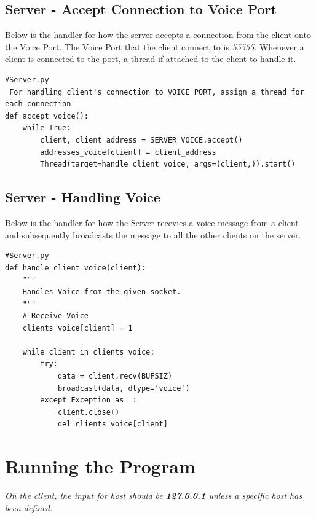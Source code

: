 \documentclass[a4paper,11pt]{article}
\begin{document}
\subsection{Server - Accept Connection to Voice Port}
Below is the handler for how the server accepts a connection from the client onto the Voice Port. The Voice Port that the client connect to is \textit{55555}. Whenever a client is connected to the port, a thread if attached to the client to handle it.

\begin{mdframed}[backgroundcolor=light-gray, roundcorner=30pt,leftmargin=1, rightmargin=1, innerleftmargin=5, innertopmargin=-3,innerbottommargin=5, outerlinewidth=1, linecolor=light-gray]
\begin{lstlisting}
#Server.py
 For handling client's connection to VOICE PORT, assign a thread for each connection
def accept_voice():
	while True:
		client, client_address = SERVER_VOICE.accept()
		addresses_voice[client] = client_address
		Thread(target=handle_client_voice, args=(client,)).start()
\end{lstlisting}
\end{mdframed}


\subsection{Server - Handling Voice}
Below is the handler for how the Server recevies a voice message from a client and subsequently broadcasts the message to all the other clients on the server.
\begin{mdframed}[backgroundcolor=light-gray, roundcorner=30pt,leftmargin=1, rightmargin=1, innerleftmargin=5, innertopmargin=-3,innerbottommargin=5, outerlinewidth=1, linecolor=light-gray]
\begin{lstlisting}
#Server.py
def handle_client_voice(client):
	"""
	Handles Voice from the given socket.
 	"""
	# Receive Voice
	clients_voice[client] = 1

	while client in clients_voice:
		try:
			data = client.recv(BUFSIZ)
			broadcast(data, dtype='voice')
		except Exception as _:
			client.close()
			del clients_voice[client]

\end{lstlisting}
\end{mdframed}

\section{Running the Program}
\textit{On the client, the input for host should be \textbf{127.0.0.1} unless a specific host has been defined.}
\end{document}
